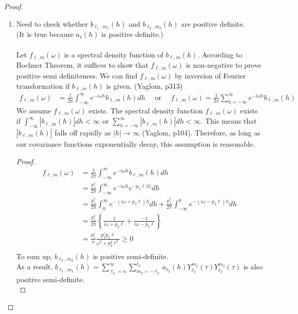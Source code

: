 \documentclass[11pt]{article}
\begin{document}
\begin{itemize}
\begin{proof}
\begin{enumerate}
\item
Need to check whether $b_{\ell_1,m_1}(h)$ and $b_{\ell_2,m_2}(h)$ are positive definite.\\ 
(It is true because $a_\ell(h)$ is positive definite.)\\
\\
Let $f_{\ell,m}(\omega)$ is a spectral density function of $b_{\ell,m}(h)$. According to Bochner Theorem, it suffices to show that $f_{\ell,m}(\omega)$ is non-negative to prove positive semi definiteness. We can find $f_{\ell,m}(\omega)$ by inversion of Fourier transformation if $b_{\ell,m}(h)$ is given. (Yaglom, p313)\\
\begin{align*}
f_{\ell,m}(\omega) &=  \frac{1}{2\pi} \int_{-\infty}^\infty e^{-i\omega h} b_{\ell,m}(h) dh \quad \text{ or } \quad f_{\ell,m}(\omega) =  \frac{1}{2\pi} \sum_{h=-\infty}^\infty e^{-i\omega h} b_{\ell,m}(h) 
\end{align*}
We assume  $f_{\ell,m}(\omega)$ exists. The spectral density function $f_{\ell,m}(\omega)$ exists if $\int_{-\infty}^\infty |b_{\ell,m}(h)|dh < \infty$ or $\sum_{h=-\infty}^\infty |b_{\ell,m}(h)|dh < \infty$. This means that $|b_{\ell,m}(h)|$ falls off rapidly as $|h| \rightarrow \infty$ (Yaglom, p104). Therefore, as long as our covariance functions exponentially decay, this assumption is reasonable.\\
\begin{proof}
\begin{align*}
f_{\ell,m}(\omega) &= \frac{1}{2\pi} \int_{-\infty}^\infty e^{-i\omega h} b_{\ell,m}(h) dh\\
&= \frac{p_1^\ell}{2\pi} \int_{-\infty}^\infty e^{-i\omega h} e^{-p_2 \ell |h|} dh\\
&= \frac{p_1^\ell}{2\pi} \int_{0}^\infty e^{-(i \omega + p_2 \ell) h} dh + \frac{p_1^\ell}{2\pi} \int_{-\infty}^0 e^{-(i \omega - p_2 \ell) h} dh\\
&= \frac{p_1^\ell}{2\pi} \left\{ \frac{1}{i \omega + p_2 \ell} + \frac{-1}{i \omega - p_2 \ell} \right\}\\
&= \frac{p_1^\ell}{\pi} \frac{p_1^\ell p_2 \ell}{\omega^2 + p_2^2 \ell^2} \ge 0\\
\end{align*}
To sum up, $b_{\ell_2,m_2}(h)$ is positive semi-definite.\\
As a result, $b_{\ell_1, m_1}(h)=\sum_{\ell_2=\kappa}^{\infty} \sum_{m_2=-\ell_2}^{\ell_2} a_{\ell_2}(h) Y_{\ell_2}^{m_2}(\tau) Y_{\ell_2}^{m_2}(\tau)$ is also positive semi-definite.\\
\end{proof}


\end{enumerate}
\end{proof}
\end{itemize}
\end{document}
